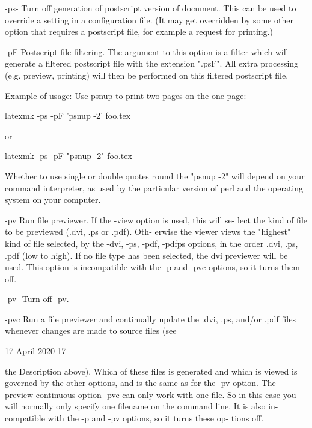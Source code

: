        -ps-   Turn off generation of postscript version of document.  This can
              be  used to override a setting in a configuration file.  (It may
              get overridden by some other option that requires  a  postscript
              file, for example a request for printing.)


       -pF    Postscript  file  filtering.   The  argument to this option is a
              filter which will generate a filtered postscript file  with  the
              extension ".psF".  All extra processing (e.g. preview, printing)
              will then be performed on this filtered postscript file.

              Example of usage: Use psnup to print two pages on the one page:

                   latexmk -ps -pF 'psnup -2' foo.tex

              or

                   latexmk -ps -pF "psnup -2" foo.tex

              Whether to use single or double quotes round the "psnup -2" will
              depend  on  your  command interpreter, as used by the particular
              version of perl and the operating system on your computer.


       -pv    Run file previewer.  If the -view option is used, this will  se-
              lect the kind of file to be previewed (.dvi, .ps or .pdf).  Oth-
              erwise the viewer views the "highest" kind of file selected,  by
              the  -dvi,  -ps,  -pdf,  -pdfps options, in the order .dvi, .ps,
              .pdf (low to high).  If no file type has been selected, the  dvi
              previewer will be used.  This option is incompatible with the -p
              and -pvc options, so it turns them off.


       -pv-   Turn off -pv.


       -pvc   Run a file previewer  and  continually  update  the  .dvi,  .ps,
              and/or .pdf files whenever changes are made to source files (see



                                 17 April 2020                              17








              the Description above).  Which of these files is  generated  and
              which  is  viewed  is  governed by the other options, and is the
              same as for the -pv option.  The preview-continuous option  -pvc
              can  only work with one file.  So in this case you will normally
              only specify one filename on the command line.  It is  also  in-
              compatible  with  the  -p and -pv options, so it turns these op-
              tions off.

